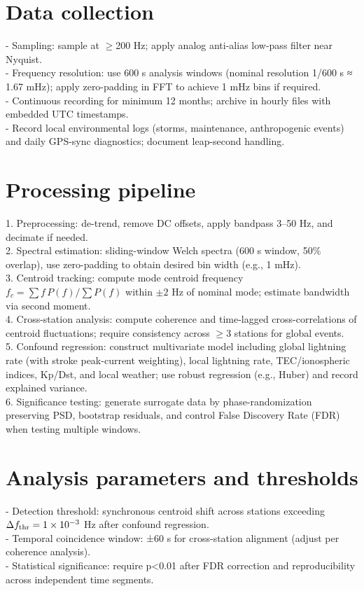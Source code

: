 \documentclass[11pt]{article}
\begin{document}
\section*{Data collection}
- Sampling: sample at $\geq$200 Hz; apply analog anti-alias low-pass filter near Nyquist.\\
- Frequency resolution: use 600 s analysis windows (nominal resolution 1/600 s ≈ 1.67 mHz); apply zero-padding in FFT to achieve 1 mHz bins if required.\\
- Continuous recording for minimum 12 months; archive in hourly files with embedded UTC timestamps.\\
- Record local environmental logs (storms, maintenance, anthropogenic events) and daily GPS-sync diagnostics; document leap-second handling.

\section*{Processing pipeline}
1. Preprocessing: de-trend, remove DC offsets, apply bandpass 3--50 Hz, and decimate if needed.\\
2. Spectral estimation: sliding-window Welch spectra (600 s window, 50\% overlap), use zero-padding to obtain desired bin width (e.g., 1 mHz).\\
3. Centroid tracking: compute mode centroid frequency $f_c = \sum f\,P(f)/\sum P(f)$ within $\pm2$ Hz of nominal mode; estimate bandwidth via second moment.\\
4. Cross-station analysis: compute coherence and time-lagged cross-correlations of centroid fluctuations; require consistency across $\geq$3 stations for global events.\\
5. Confound regression: construct multivariate model including global lightning rate (with stroke peak-current weighting), local lightning rate, TEC/ionospheric indices, Kp/Dst, and local weather; use robust regression (e.g., Huber) and record explained variance.\\
6. Significance testing: generate surrogate data by phase-randomization preserving PSD, bootstrap residuals, and control False Discovery Rate (FDR) when testing multiple windows.

\section*{Analysis parameters and thresholds}
- Detection threshold: synchronous centroid shift across stations exceeding $\Delta f_{\rm thr}=1\times10^{-3}$ Hz after confound regression.\\
- Temporal coincidence window: ±60 s for cross-station alignment (adjust per coherence analysis).\\
- Statistical significance: require p<0.01 after FDR correction and reproducibility across independent time segments.
\end{document}
